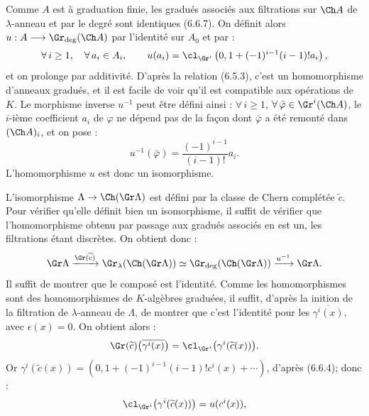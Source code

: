 
Comme \(A\) est à graduation finie, les gradués associés aux filtrations sur \(\Ch A\) de \(\lambda\)-anneau et par le degré sont identiques (6.6.7). On définit alors \(u:A\longrightarrow \Gr_{\deg}(\Ch A)\) par l'identité sur \(A_0\) et par :
\[
  \forall\, i\ge1,\quad\forall\, a_i\in A_i,\qquad u(a_i)=\cl_{\Gr^i}\left(0,1+(-1)^{i-1}(i-1)!a_i\right),
\]
et on prolonge par additivité. D'après la relation (6.5.3), c'est un homomorphisme d'anneaux gradués, et il est facile de voir qu'il est compatible aux opérations de \(K\). Le morphisme inverse \(u^{-1}\) peut être défini ainsi : \(\forall\, i\ge1\), \(\forall\,\bar\varphi\in\Gr^i(\Ch A)\), le \(i\)-ième coefficient \(a_i\) de \(\varphi\) ne dépend pas de la façon dont \(\bar\varphi\) a été remonté dans \((\Ch A)_i\), et on pose :
\[
  u^{-1}(\bar\varphi)=\frac{(-1)^{i-1}}{(i-1)!}a_i.
\]
L'homomorphisme \(u\) est donc un isomorphisme.

L'isomorphisme \(\Lambda\to\Ch(\Gr\Lambda)\) est défini par la classe de Chern complétée \(\widetilde c\). Pour vérifier qu'elle définit bien un isomorphisme, il suffit de vérifier que l'homomorphisme obtenu par passage aux gradués associés en est un, les filtrations étant discrètes. On obtient donc :
\[
  \Gr\Lambda
   \xrightarrow{\Gr(\widetilde c)}
  \Gr_{\lambda}(\Ch(\Gr\Lambda))
   \simeq
  \Gr_{\deg}(\Ch(\Gr\Lambda))
   \xrightarrow{u^{-1}}
  \Gr\Lambda .
\]
Il suffit de montrer que le composé est l'identité. Comme les homomorphismes sont des homomorphismes de \(K\)-algèbres graduées, il suffit, d'après la \hphantom{déf}inition de la filtration de \(\lambda\)-anneau de \(\Lambda\), de montrer que c'est l'identité pour les \(\overline{\gamma^i(x)}\), avec \(\epsilon(x)=0\). On obtient alors :
\[
  \Gr(\widetilde c)\bigl(\overline{\gamma^i(x)}\bigr)
  =
  \cl_{\Gr^i}\bigl(\gamma^i(\widetilde c(x))\bigr).
\]
Or \(\gamma^i(\widetilde c(x))=(0,1+(-1)^{i-1}(i-1)!c^i(x)+\cdots)\), d'après (6.6.4); donc :
\[
  \cl_{\Gr^i}\bigl(\gamma^i(\widetilde c(x))\bigr)=u(c^i(x)),
\]
